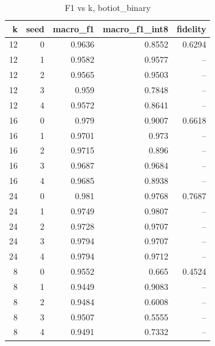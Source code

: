 \begin{table}
\caption{F1 vs k, botiot_binary}
\begin{tabular}{rrrrr}
\toprule
k & seed & macro_f1 & macro_f1_int8 & fidelity \\
\midrule
12 & 0 & 0.9636 & 0.8552 & 0.6294 \\
12 & 1 & 0.9582 & 0.9577 & -- \\
12 & 2 & 0.9565 & 0.9503 & -- \\
12 & 3 & 0.959 & 0.7848 & -- \\
12 & 4 & 0.9572 & 0.8641 & -- \\
16 & 0 & 0.979 & 0.9007 & 0.6618 \\
16 & 1 & 0.9701 & 0.973 & -- \\
16 & 2 & 0.9715 & 0.896 & -- \\
16 & 3 & 0.9687 & 0.9684 & -- \\
16 & 4 & 0.9685 & 0.8938 & -- \\
24 & 0 & 0.981 & 0.9768 & 0.7687 \\
24 & 1 & 0.9749 & 0.9807 & -- \\
24 & 2 & 0.9728 & 0.9707 & -- \\
24 & 3 & 0.9794 & 0.9707 & -- \\
24 & 4 & 0.9794 & 0.9712 & -- \\
8 & 0 & 0.9552 & 0.665 & 0.4524 \\
8 & 1 & 0.9449 & 0.9083 & -- \\
8 & 2 & 0.9484 & 0.6008 & -- \\
8 & 3 & 0.9507 & 0.5555 & -- \\
8 & 4 & 0.9491 & 0.7332 & -- \\
\bottomrule
\end{tabular}
\end{table}
